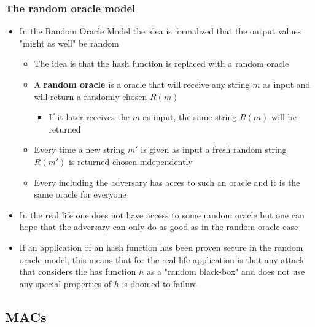 \subsubsection{The random oracle model}
\begin{itemize}
  \item In the Random Oracle Model the idea is formalized that the output values "might as well" be random
  \begin{itemize}
  	\item The idea is that the hash function is replaced with a random oracle
  	\item A \textbf{random oracle} is a oracle that will receive any string $m$ as input and will return a randomly chosen $R(m)$
    \begin{itemize}
  		\item If it later receives the $m$ as input, the same string $R(m)$ will be returned
    \end{itemize}
  	\item Every time a new string $m'$ is given as input a fresh random string $R(m')$ is returned chosen independently
  	\item Every including the adversary has acces to such an oracle and it is the same oracle for everyone
  \end{itemize}
  \item In the real life one does not have access to some random oracle but one can hope that the adversary can only do as good as in the random oracle case
  \item If an application of an hash function has been proven secure in the random oracle model, this means that for the real life application is that any attack that considers the has function $h$ as a "random black-box" and does not use any special properties of $h$ is doomed to failure
\end{itemize}

\subsection{MACs}
